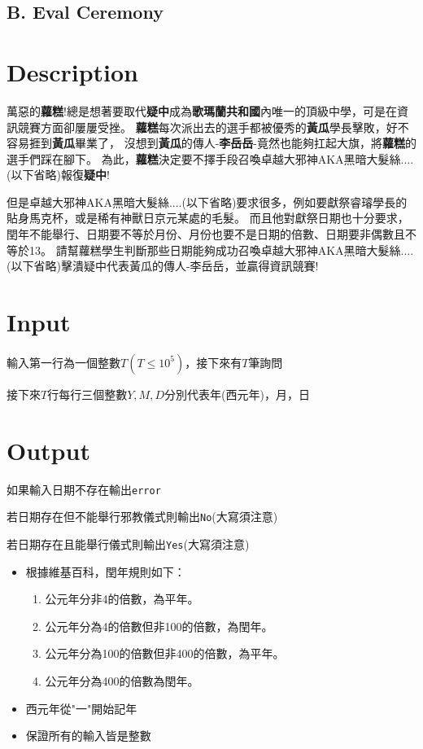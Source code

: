 \documentclass[11pt,a4paper]{article}
\begin{document}
\begin{center}
\section*{B. Eval Ceremony}
\end{center}

\section*{Description}


萬惡的\textbf{蘿糕}!總是想著要取代\textbf{疑中}成為\textbf{歌瑪蘭共和國}內唯一的頂級中學，可是在資訊競賽方面卻屢屢受挫。
\textbf{蘿糕}每次派出去的選手都被優秀的\textbf{黃瓜}學長擊敗，好不容易捱到\textbf{黃瓜}畢業了，
沒想到\textbf{黃瓜}的傳人-\textbf{李岳岳}-竟然也能夠扛起大旗，將\textbf{蘿糕}的選手們踩在腳下。
為此，\textbf{蘿糕}決定要不擇手段召喚卓越大邪神AKA黑暗大髮絲....(以下省略)報復\textbf{疑中}!

但是卓越大邪神AKA黑暗大髮絲....(以下省略)要求很多，例如要獻祭睿璿學長的貼身馬克杯，或是稀有神獸日京元某處的毛髮。
而且他對獻祭日期也十分要求，閏年不能舉行、日期要不等於月份、月份也要不是日期的倍數、日期要非偶數且不等於13。
請幫蘿糕學生判斷那些日期能夠成功召喚卓越大邪神AKA黑暗大髮絲....(以下省略)擊潰疑中代表黃瓜的傳人-李岳岳，並贏得資訊競賽!

\section*{Input}

輸入第一行為一個整數$T(T\le 10^5)$，接下來有$T$筆詢問

接下來$T$行每行三個整數$Y,M,D$分別代表年(西元年)，月，日

\section*{Output}

如果輸入日期不存在輸出\texttt{error}

若日期存在但不能舉行邪教儀式則輸出\texttt{No}(大寫須注意)

若日期存在且能舉行儀式則輸出\texttt{Yes}(大寫須注意)

\begin{itemize}
\item 根據維基百科，閏年規則如下：
    \begin{enumerate}
    \item 公元年分非4的倍數，為平年。
    \item 公元年分為4的倍數但非100的倍數，為閏年。
    \item 公元年分為100的倍數但非400的倍數，為平年。
    \item 公元年分為400的倍數為閏年。
    \end{enumerate}
\item 西元年從"一"開始記年
\item 保證所有的輸入皆是整數
\end{itemize}
\end{document}
